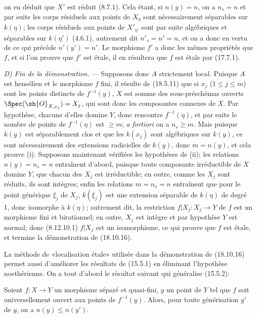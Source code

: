 
on en déduit que $X'$ est réduit (8.7.1). Cela étant, si $n(y)=n$, on a $n_s=n$ et par suite les corps résiduels aux points de $X_\eta$ sont nécessairement séparables sur $k(\eta)$; les corps résiduels aux points de $X'_{\eta'}$ sont par suite algébriques et séparables sur $k(\eta')$ (4.6.1), autrement dit $n'_s=n'=n$, et on a donc en vertu de ce qui précède $n'(y')=n'$. Le morphisme $f'$ a donc les mêmes propriétés que $f$, et si l'on prouve que $f'$ est étale, il en résultera que $f$ est étale par (17.7.1).

\emph{D) Fin de la démonstration.} --- Supposons donc $A$ strictement local. Puisque $A$ est hensélien et le morphisme $f$ fini, il résulte de (18.5.11) que si $x_j$ ($1\leq j\leq m$) sont les points distincts de $f^{-1}(y)$, $X$ est somme des sous-préschémas ouverts $\Spec(\sh{O}_{X,x_j})=X_j$, qui sont donc les composantes connexes de $X$. Par hypothèse, chacune d'elles domine $Y$, donc rencontre $f^{-1}(\eta)$, et par suite le nombre de points de $f^{-1}(\eta)$ est $\geq m$; \emph{a fortiori} on a $n_s\geq m$. Mais puisque $k(y)$ est séparablement clos et que les $k(x_j)$ sont algébriques sur $k(y)$, ce sont nécessairement des extensions radicielles de $k(y)$, donc $m=n(y)$, et cela prouve (i). Supposons maintenant vérifiées les hypothèses de (ii); les relations $n(y)=n_s=n$ entraînent d'abord, puisque toute composante irréductible de $X$ domine $Y$, que chacun des $X_j$ est irréductible; en outre, comme les $X_j$ sont réduits, ils sont intègres; enfin les relations $m=n_s=n$ entraînent que pour le point générique $\xi_j$ de $X_j$, $k(\xi_j)$ est une extension séparable de $k(\eta)$ de degré 1, donc isomorphe à $k(\eta)$; autrement dit, la restriction $f|X_j:X_j\to Y$ de $f$ est un morphisme fini et birationnel; en outre, $X_j$ est intègre et par hypothèse $Y$ est normal; donc (8.12.10.1) $f|X_j$ est un isomorphisme, ce qui prouve que $f$ est étale, et termine la démonstration de (18.10.16).

\begin{remark}[18.10.17]
\label{IV.18.10.17}
La méthode de «localisation étale» utilisée dans la démonstration de (18.10.16) permet aussi d'améliorer les résultats de (15.5.1) en éliminant l'hypothèse noethérienne. On a tout d'abord le résultat suivant qui généralise (15.5.2):
\end{remark}

\begin{env}[18.10.17.1]
\label{IV.18.10.17.1}
Soient $f:X\to Y$ un morphisme séparé et quasi-fini, $y$ un point de $Y$ tel que $f$ soit universellement ouvert aux points de $f^{-1}(y)$. Alors, pour toute générisation $y'$ de $y$, on a $n(y)\leq n(y')$.
\end{env}

